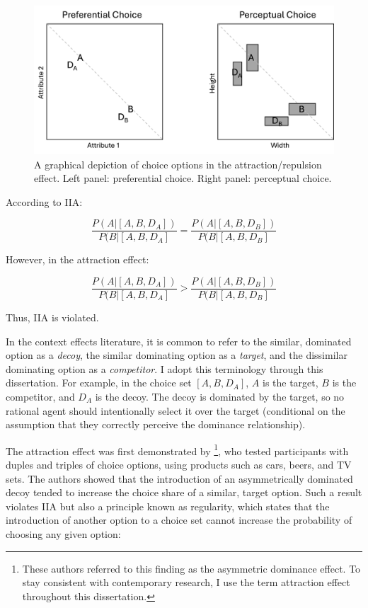 \begin{figure}
   \includegraphics[width=\linewidth]{figures/pref_v_percep.jpg}
   \caption{A graphical depiction of choice options in the attraction/repulsion effect. Left panel: preferential choice. Right panel: perceptual choice.}
   \label{fig:fig_opts}
\end{figure}

According to IIA:

\begin{equation}
  \frac{P(A|[A,B,D_{A}])}{P(B|[A,B,D_{A}]}=\frac{P(A|[A,B,D_{B}])}{P(B|[A,B,D_{B}]}
  \label{eqn:iia}
\end{equation}

However, in the attraction effect:

\begin{equation}
  \frac{P(A|[A,B,D_{A}])}{P(B|[A,B,D_{A}]}>\frac{P(A|[A,B,D_{B}])}{P(B|[A,B,D_{B}]}
  \label{eqn:iia_att}
\end{equation}

Thus, IIA is violated.

In the context effects literature, it is common to refer to the similar, dominated option as a \textit{decoy}, the similar dominating option as a \textit{target}, and the dissimilar dominating option as a \textit{competitor}. I adopt this terminology through this dissertation. For example, in the choice set $[A,B,D_{A}]$, $A$ is the target, $B$ is the competitor, and $D_{A}$ is the decoy.  The decoy is dominated by the target, so no rational agent should intentionally select it over the target (conditional on the assumption that they correctly perceive the dominance relationship).  

The attraction effect was first demonstrated by \textcite{huberAddingAsymmetricallyDominated1982d} \footnote{These authors referred to this finding as the asymmetric dominance effect. To stay consistent with contemporary research, I use the term attraction effect throughout this dissertation.}, who tested participants with duples and triples of choice options, using products such as cars, beers, and TV sets. The authors showed that the introduction of an asymmetrically dominated decoy tended to increase the choice share of a similar, target option. Such a result violates IIA but also a principle known as regularity, which states that the introduction of another option to a choice set cannot increase the probability of choosing any given option:

